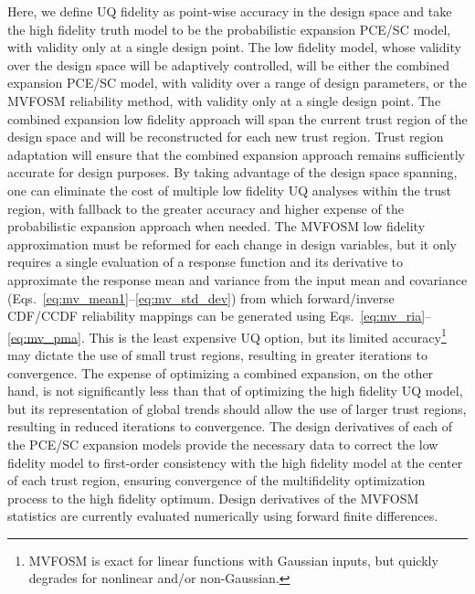Here, we define UQ fidelity as point-wise accuracy in the design space
and take the high fidelity truth model to be the probabilistic
expansion PCE/SC model, with validity only at a single design point.
The low fidelity model, whose validity over the design space will be
adaptively controlled, will be either the combined expansion PCE/SC
model, with validity over a range of design parameters, or the MVFOSM
reliability method, with validity only at a single design point.  The
combined expansion low fidelity approach will span the current trust
region of the design space and will be reconstructed for each new
trust region.  Trust region adaptation will ensure that the combined
expansion approach remains sufficiently accurate for design purposes.
By taking advantage of the design space spanning, one can eliminate
the cost of multiple low fidelity UQ analyses within the trust region,
with fallback to the greater accuracy and higher expense of the
probabilistic expansion approach when needed.  The MVFOSM low fidelity
approximation must be reformed for each change in design variables,
but it only requires a single evaluation of a response function and
its derivative to approximate the response mean and variance from the
input mean and covariance
(Eqs.~\ref{eq:mv_mean1}--\ref{eq:mv_std_dev}) from which
forward/inverse CDF/CCDF reliability mappings can be generated using
Eqs.~\ref{eq:mv_ria}--\ref{eq:mv_pma}.  This is the least expensive UQ
option, but its limited accuracy\footnote{MVFOSM is exact for linear
  functions with Gaussian inputs, but quickly degrades for nonlinear
  and/or non-Gaussian.} may dictate the use of small trust regions,
resulting in greater iterations to convergence.  The expense of
optimizing a combined expansion, on the other hand, is not
significantly less than that of optimizing the high fidelity UQ model,
but its representation of global trends should allow the use of larger
trust regions, resulting in reduced iterations to convergence.
The design derivatives of each of the PCE/SC expansion models provide
the necessary data to correct the low fidelity model to first-order
consistency with the high fidelity model at the center of each trust
region, ensuring convergence of the multifidelity optimization process 
to the high fidelity optimum.  Design derivatives of the MVFOSM 
statistics are currently evaluated numerically using forward finite 
differences.

